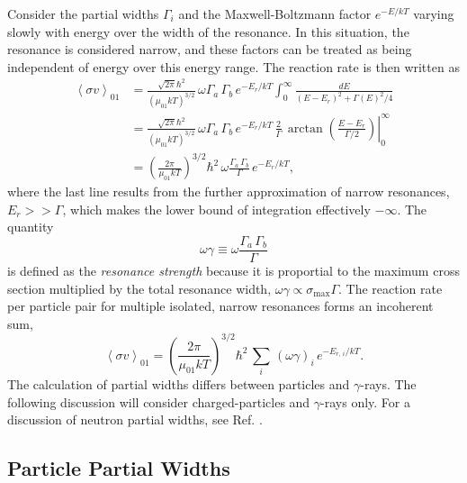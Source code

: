 Consider the partial widths $\Gamma_{i}$ and the Maxwell-Boltzmann factor $e^{-E/kT}$ varying slowly with energy over the width of the resonance. In this situation, the resonance is considered narrow, and these factors can be treated as being independent of energy over this energy range. The reaction rate is then written as
\begin{align}
\left\langle \sigma v \right\rangle_{01} &= \frac{\sqrt{2 \pi} \hbar^{2}}{\left(\mu_{01} k T\right)^{3/2}} \, \omega \Gamma_{a} \, \Gamma_{b} \, e^{-E_{r}/kT} \int_{0}^{\infty} \frac{dE}{\left(E - E_{r}\right)^{2} + \Gamma(E)^{2}/4} \nonumber \\
&= \frac{\sqrt{2 \pi} \hbar^{2}}{\left(\mu_{01} k T\right)^{3/2}} \, \omega \Gamma_{a} \, \Gamma_{b} \, e^{-E_{r}/kT} \, \frac{2}{\Gamma} \, \left. \arctan\left( \frac{E - E_{r}}{\Gamma/2} \right)\right|_{0}^{\infty} \nonumber \\
&= \left(\frac{2 \pi}{\mu_{01} k T}\right)^{3/2} \hbar^{2} \, \omega \frac{\Gamma_{a} \, \Gamma_{b}}{\Gamma} \, e^{-E_{r}/kT},
\end{align}
where the last line results from the further approximation of narrow resonances, $E_{r} >> \Gamma$, which makes the lower bound of integration effectively $-\infty$. The quantity
\begin{equation}
\omega \gamma \equiv \omega \frac{\Gamma_{a} \, \Gamma_{b}}{\Gamma}
\end{equation}
is defined as the \emph{resonance strength} because it is proportial to the maximum cross section multiplied by the total resonance width, $\omega \gamma \propto \sigma_{\mathrm{max}} \Gamma$. The reaction rate per particle pair for multiple isolated, narrow resonances forms an incoherent sum,
\begin{equation}
\left\langle \sigma v \right\rangle_{01} = \left(\frac{2 \pi}{\mu_{01} k T}\right)^{3/2} \hbar^{2} \, \sum_{i} \, (\omega \gamma)_{i} \, e^{-E_{r, \, i}/kT}.
\end{equation}
The calculation of partial widths differs between particles and $\gamma$-rays. The following discussion will consider charged-particles and $\gamma$-rays only. For a discussion of neutron partial widths, see Ref. \cite{Iliadis2015}.

\subsection{Particle Partial Widths}

